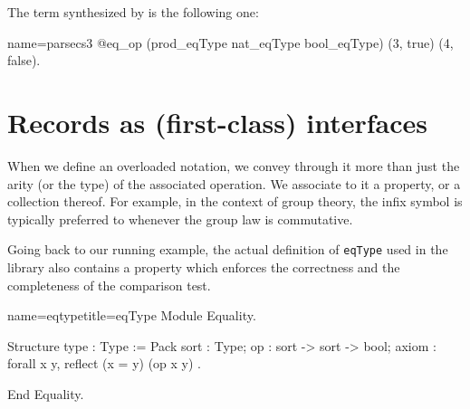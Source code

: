 The term synthesized by \Coq{} is the following one:

\begin{coq}{name=parsecs3}{}
   @eq_op (prod_eqType nat_eqType bool_eqType) (3, true) (4, false).
\end{coq}

%

\section{Records as (first-class) interfaces}\label{rec:itf}

When we define an overloaded notation, we convey
through it more than just the arity (or the type) of the associated
operation.  We associate to it a property, or a collection thereof.
For example, in the context of group theory, the infix \C{+} symbol
is typically preferred to \C{*} whenever the group law is
commutative.

Going back to our running example, the actual definition of \lstinline/eqType/
used in the \mcbMC{} library also contains a property which enforces
the correctness and the completeness of the comparison test.

\begin{coq}{name=eqtype}{title=eqType}
Module Equality.

Structure type : Type := Pack {
  sort : Type;
  op : sort -> sort -> bool;
  axiom : forall x y, reflect (x = y) (op x y)
}.

End Equality.
\end{coq}

